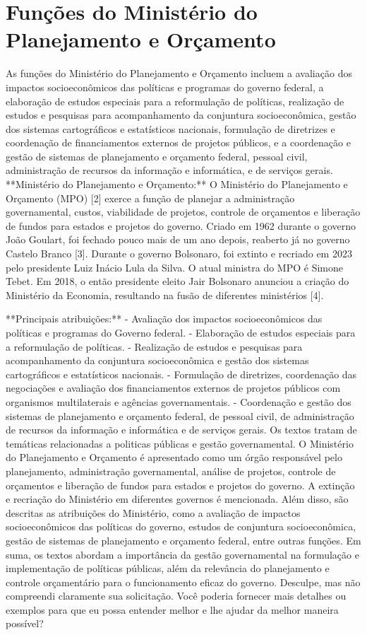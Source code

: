 \documentclass[
   article,       
   12pt,          
   oneside,       
   a4paper,       
   english,       
   brazil,        
   sumario=tradicional
   ]{abntex2}
\begin{document}
\section{Funções do Ministério do Planejamento e Orçamento}

As funções do Ministério do Planejamento e Orçamento incluem a avaliação dos impactos socioeconômicos das políticas e programas do governo federal, a elaboração de estudos especiais para a reformulação de políticas, realização de estudos e pesquisas para acompanhamento da conjuntura socioeconômica, gestão dos sistemas cartográficos e estatísticos nacionais, formulação de diretrizes e coordenação de financiamentos externos de projetos públicos, e a coordenação e gestão de sistemas de planejamento e orçamento federal, pessoal civil, administração de recursos da informação e informática, e de serviços gerais.
**Ministério do Planejamento e Orçamento:** O Ministério do Planejamento e Orçamento (MPO) [2] exerce a função de planejar a administração governamental, custos, viabilidade de projetos, controle de orçamentos e liberação de fundos para estados e projetos do governo. Criado em 1962 durante o governo João Goulart, foi fechado pouco mais de um ano depois, reaberto já no governo Castelo Branco [3]. Durante o governo Bolsonaro, foi extinto e recriado em 2023 pelo presidente Luiz Inácio Lula da Silva. O atual ministra do MPO é Simone Tebet. Em 2018, o então presidente eleito Jair Bolsonaro anunciou a criação do Ministério da Economia, resultando na fusão de diferentes ministérios [4].

**Principais atribuições:**
- Avaliação dos impactos socioeconômicos das políticas e programas do Governo federal.
- Elaboração de estudos especiais para a reformulação de políticas.
- Realização de estudos e pesquisas para acompanhamento da conjuntura socioeconômica e gestão dos sistemas cartográficos e estatísticos nacionais.
- Formulação de diretrizes, coordenação das negociações e avaliação dos financiamentos externos de projetos públicos com organismos multilaterais e agências governamentais.
- Coordenação e gestão dos sistemas de planejamento e orçamento federal, de pessoal civil, de administração de recursos da informação e informática e de serviços gerais.
Os textos tratam de temáticas relacionadas a politicas públicas e gestão governamental. O Ministério do Planejamento e Orçamento é apresentado como um órgão responsável pelo planejamento, administração governamental, análise de projetos, controle de orçamentos e liberação de fundos para estados e projetos do governo. A extinção e recriação do Ministério em diferentes governos é mencionada. Além disso, são descritas as atribuições do Ministério, como a avaliação de impactos socioeconômicos das políticas do governo, estudos de conjuntura socioeconômica, gestão de sistemas de planejamento e orçamento federal, entre outras funções. Em suma, os textos abordam a importância da gestão governamental na formulação e implementação de políticas públicas, além da relevância do planejamento e controle orçamentário para o funcionamento eficaz do governo.
Desculpe, mas não compreendi claramente sua solicitação. Você poderia fornecer mais detalhes ou exemplos para que eu possa entender melhor e lhe ajudar da melhor maneira possível?
\postextual

\end{document}
